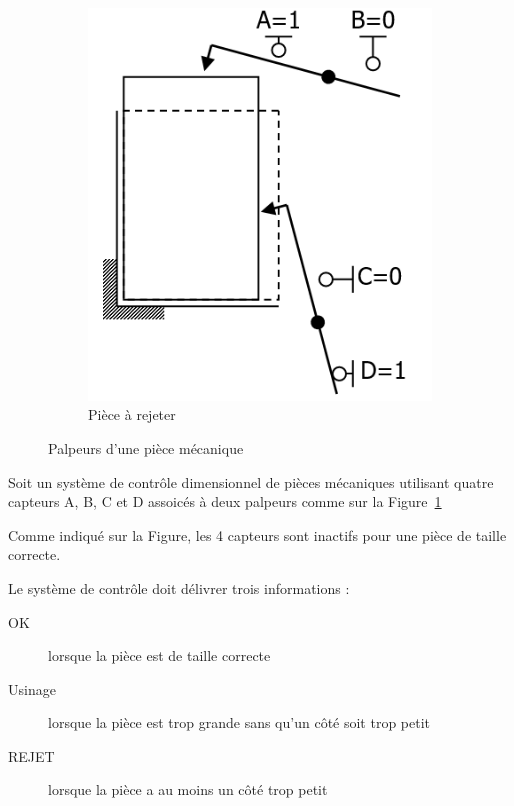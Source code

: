 \begin{figure}[ht]
\begin{subfigure}{0.49\textwidth}
        \includegraphics[width=\textwidth, height=.25\textheight, keepaspectratio]{images/TP01_Ex02_palpeur02}
        \caption{Pièce à rejeter}
    \end{subfigure}
    \caption{Palpeurs d'une pièce mécanique}
    \label{fig:palpeurs}
\end{figure}

Soit un système de contrôle dimensionnel de pièces mécaniques utilisant quatre capteurs A, B, C et D assoicés à deux palpeurs comme sur la Figure~\ref{fig:palpeurs}

Comme indiqué sur la Figure, les 4 capteurs sont inactifs pour une pièce de taille correcte. 

Le système de contrôle doit délivrer trois informations : 
\begin{description}
    \item[OK] lorsque la pièce est de taille correcte
    \item[Usinage] lorsque la pièce est trop grande sans qu'un côté soit trop petit
    \item[REJET] lorsque la pièce a au moins un côté trop petit  
\end{description}

